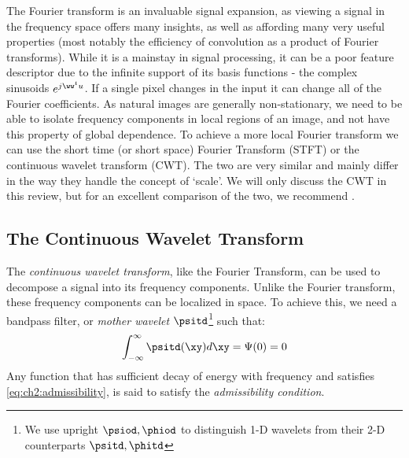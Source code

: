The Fourier transform is an invaluable signal expansion, as viewing a signal in
the frequency space offers many insights, as well as affording many very useful
properties (most notably the efficiency of convolution as a product of Fourier
transforms). While it is a mainstay in signal processing, 
it can be a poor
feature descriptor due to the infinite support of its basis functions - the
complex sinusoids $e^{j\ww^t u}$. If
a single pixel changes in the input it can change all of the
Fourier coefficients. As natural images are generally non-stationary, we need
to be able to isolate frequency components in local regions of an image, and
not have this property of global dependence. To achieve a more local Fourier
transform we can use the short time (or short space) Fourier Transform (STFT) or the
continuous wavelet transform (CWT). The two are very similar and mainly differ in the
way they handle the concept of `scale'. We will only discuss the CWT in this review, 
but for an excellent comparison of the two, we recommend \cite[Chapter~1]{antoine_two-dimensional_2004}.


\subsection{The Continuous Wavelet Transform}
The \emph{continuous wavelet transform}, like the Fourier Transform, can be used
to decompose a signal into its frequency components. Unlike the Fourier
transform, these frequency components can be localized in space. To
achieve this, we need a bandpass filter, or \emph{mother wavelet}
$\psitd$\footnote{We use upright $\psiod, \phiod$ to distinguish 1-D wavelets
from their 2-D counterparts $\psitd, \phitd$} such that:
\begin{equation}
  \int_{-\infty}^{\infty} \psitd(\xy) d\xy = \Psi(0) = 0\label{eq:ch2:admissibility}
\end{equation}
Any function that has sufficient decay of energy with frequency and satisfies
\eqref{eq:ch2:admissibility}, is said to satisfy the \emph{admissibility condition}.


